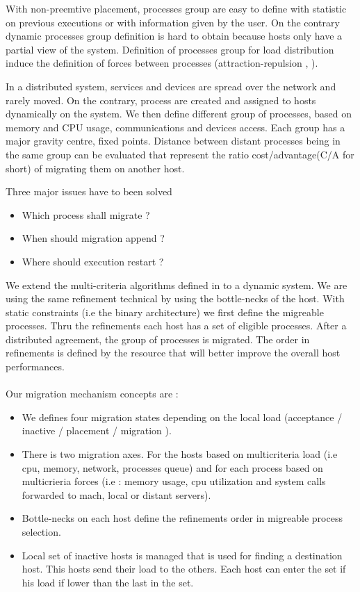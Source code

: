 With non-preemtive placement, processes group are easy to define with statistic on previous executions or with 
information given by the user. 
On the contrary dynamic processes group definition is hard to obtain because hosts only have a partial view of the system. 
Definition of processes group for load distribution \cite {dickman91} induce the definition of forces between processes 
(attraction-repulsion \cite {folliot:these}, \cite {tokoro90}).

In a distributed system, services and devices are spread over the network and rarely moved. On the contrary, 
process are created and assigned to hosts dynamically on the system.
We then define different group of processes, based on memory and CPU usage, communications and devices access. 
Each group has a major gravity centre, fixed points. Distance between distant processes being in the same group 
can be evaluated that represent the ratio cost/advantage(C/A for short) of migrating them on another host.

Three major issues have to been solved
\begin{itemize}
        \item Which process shall migrate ?
        \item When should migration append ?
        \item Where should execution restart ?
\end{itemize}

We extend the multi-criteria algorithms defined in \cite {folliot:these} to a dynamic system. 
We are using the same refinement technical by using the bottle-necks of the host. 
With static constraints (i.e the binary architecture) we first define the migreable processes. Thru 
the refinements each host has a set of eligible processes. After a distributed agreement, the group of processes is migrated.
The order in refinements is defined by the resource that will better improve the overall host performances.\\
	\\Our migration mechanism concepts are :
\begin{itemize}
        \item We defines four migration states depending on the local load (acceptance / inactive / placement / migration ).
        \item There is two migration axes. For the hosts based on multicriteria load (i.e cpu, memory, network, processes queue)
 and for each process based on multicrieria forces (i.e : memory usage, cpu utilization and system calls forwarded to mach, 
local or distant servers).
        \item Bottle-necks on each host define the refinements order in migreable process selection.
        \item Local set of inactive hosts is managed that is used for finding a destination host. 
This hosts send their load to the others. Each host can enter the set if his load if lower than the last in the set. 
\end{itemize}

